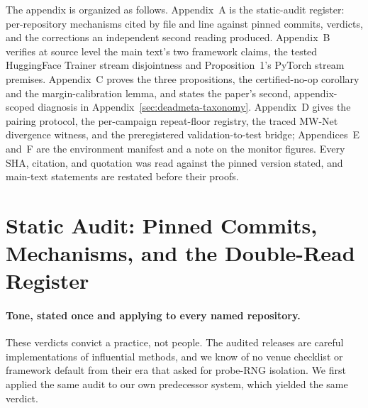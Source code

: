 \noindent The appendix is organized as follows. Appendix~A is the static-audit
register: per-repository mechanisms cited by file and line against pinned
commits, verdicts, and the corrections an independent second reading produced.
Appendix~B verifies at source level the main text's two framework claims,
the tested HuggingFace Trainer stream disjointness and Proposition~1's PyTorch stream
premises. Appendix~C proves the three propositions, the certified-no-op corollary and
the margin-calibration lemma, and states the paper's second, appendix-scoped
diagnosis in Appendix~\ref{sec:deadmeta-taxonomy}. Appendix~D gives the pairing
protocol, the per-campaign repeat-floor registry, the traced MW-Net divergence
witness, and the preregistered validation-to-test bridge; Appendices~E and~F
are the environment manifest and a note on the monitor figures. Every SHA,
citation, and quotation was read against the pinned version stated, and
main-text statements are restated before their proofs.

\section{Static Audit: Pinned Commits, Mechanisms, and the Double-Read
Register}
\label{sec:audit}

\paragraph{Tone, stated once and applying to every named repository.}
These verdicts convict a practice, not people. The audited releases are careful
implementations of influential methods, and we know of no venue checklist or
framework default from their era that asked for probe-RNG isolation. We first
applied the same audit to our own predecessor system, which yielded the same
verdict.

